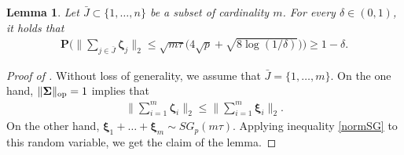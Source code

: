 \documentclass[aos,preprint,reqno]{imsart}
\newcommand\bxi{\boldsymbol\xi}
\newcommand\bzeta{\boldsymbol\zeta}
\newcommand\bSigma{\boldsymbol\Sigma}
\theoremstyle{plain}
\newtheorem{lemma}{Lemma}
\theoremstyle{remark}
\begin{document}
    \begin{lemma}\label{lem:9}
    Let $\bar J \subset \{1,\ldots,n\}$ be a subset of cardinality $m$. 
    For every $\delta\in(0,1)$, it holds that
    \begin{align}
        \mathbf P\bigg(\bigg\|\sum_{j\in\bar J} \bzeta_j\bigg\|_2
        \le \sqrt{m\tau}\big(4\sqrt{p} + \sqrt{8\log(1/\delta)}
        \big)\bigg)\ge 1-\delta.
    \end{align}
    \end{lemma}
    
    \begin{proof}[Proof of ]
    Without loss of generality, we assume that $\bar J = \{1,\ldots,m\}$.
    On the one hand,  $\|\bSigma\|_{\textup{op}}=1$ implies that 
    \begin{align}
        \bigg\|\sum_{i=1}^m \bzeta_i\bigg\|_2 \le 
        \bigg\|\sum_{i=1}^m \bxi_i\bigg\|_2.
    \end{align}
    On the other hand, $\bxi_1+\ldots+\bxi_m\sim SG_p(m\tau)$. 
    Applying inequality \eqref{normSG} to this random variable,
    we get the claim of the lemma. 
    \end{proof}
    
\end{document}
